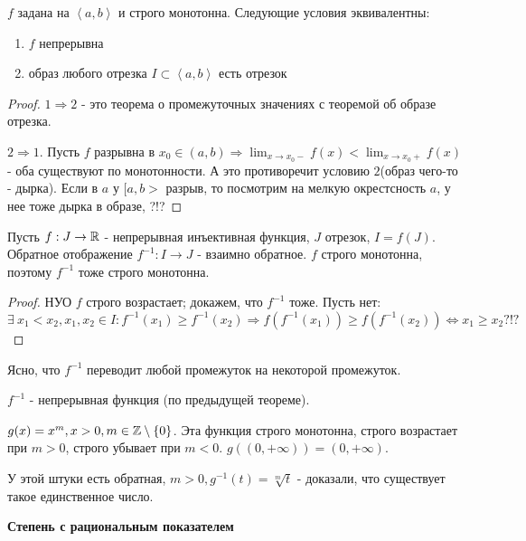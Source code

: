 \documentclass[12pt]{report}
\begin{document}
\begin{thm}
$f$ задана на $\left<a, b\right>$ и строго монотонна. Следующие условия эквивалентны:
\begin{enumerate}
\item $f$ непрерывна
\item образ любого отрезка $I \subset \left<a, b\right>$ есть отрезок
\end{enumerate}
\end{thm}
\begin{proof}
$1 \Rightarrow 2$  - это теорема о промежуточных значениях с теоремой об образе отрезка.

$2 \Rightarrow 1$. Пусть $f$ разрывна в $x_0 \in (a, b) \Rightarrow \lim_{x \to x_0-}{f(x)} < \lim_{x \to x_0+}{f(x)}$ - оба существуют по монотонности. А это противоречит условию $2$(образ чего-то - дырка). Если в $a$ у $[a, b>$ разрыв, то посмотрим на мелкую окрестсность $a$, у нее тоже дырка в образе, ?!?
\end{proof}

\begin{st}
Пусть $f: J \to \mathbb{R}$  - непрерывная инъективная функция, $J$ отрезок, $I = f(J)$. Обратное отображение $f^{-1}: I \to J$ - взаимно обратное. $f$ строго монотонна, поэтому $f^{-1}$ тоже строго монотонна.
\end{st}
\begin{proof}
НУО $f$ строго возрастает; докажем, что $f^{-1}$ тоже. Пусть нет: $\exists ~x_1 < x_2, x_1, x_2 \in I: f^{-1}(x_1) \ge f^{-1}(x_2) \Rightarrow f(f^{-1}(x_1)) \ge f(f^{-1}(x_2)) \Leftrightarrow x_1 \ge x_2 ?!?$
\end{proof}
\begin{cor}
Ясно, что $f^{-1}$ переводит любой промежуток на некоторой промежуток.

$f^{-1}$ - непрерывная функция (по предыдущей теореме).
\end{cor}
\begin{ex}
$g(x) = x^m, x > 0, m \in \mathbb{Z}\setminus\{0\}$. Эта функция строго монотонна, строго возрастает при $m > 0$, строго убывает при $m < 0$. $g((0, +\infty)) = (0, +\infty)$.


У этой штуки есть обратная, $m > 0, g^{-1}(t) = \sqrt[m]{t}$ - доказали, что существует такое единственное число.
\end{ex}

{\bfseries Степень с рациональным показателем}
\end{document}
